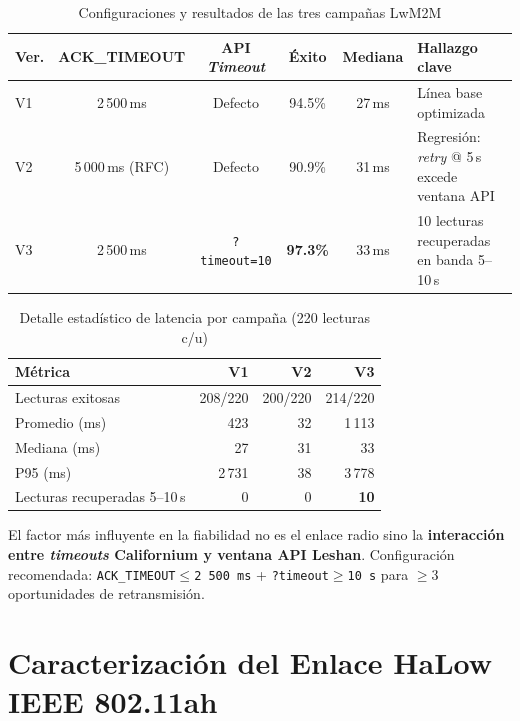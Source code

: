 \begin{table}[H]
\centering
\caption{Configuraciones y resultados de las tres campañas LwM2M}
\label{tab:versiones-v1v2v3}
\footnotesize
\begin{tabularx}{\textwidth}{l c c c c X}
\toprule
\textbf{Ver.} & \textbf{ACK\_TIMEOUT} & \textbf{API \emph{Timeout}} & \textbf{Éxito} & \textbf{Mediana} & \textbf{Hallazgo clave} \\
\midrule
V1 & 2\,500\,ms & Defecto & 94.5\% & 27\,ms & Línea base optimizada \\
V2 & 5\,000\,ms (RFC) & Defecto & 90.9\% & 31\,ms & Regresión: \emph{retry} @ 5\,s excede ventana API \\
V3 & 2\,500\,ms & \texttt{?timeout=10} & \textbf{97.3\%} & 33\,ms & 10 lecturas recuperadas en banda 5--10\,s \\
\bottomrule
\end{tabularx}
\end{table}

\begin{table}[H]
\centering
\caption{Detalle estadístico de latencia por campaña (220 lecturas c/u)}
\label{tab:resultados-v1v2v3}
\footnotesize
\begin{tabular}{l r r r}
\toprule
\textbf{Métrica} & \textbf{V1} & \textbf{V2} & \textbf{V3} \\
\midrule
Lecturas exitosas & 208/220 & 200/220 & 214/220 \\
Promedio (ms) & 423 & 32 & 1\,113 \\
Mediana (ms) & 27 & 31 & 33 \\
P95 (ms) & 2\,731 & 38 & 3\,778 \\
Lecturas recuperadas 5--10\,s & 0 & 0 & \textbf{10} \\
\bottomrule
\end{tabular}
\end{table}

El factor más influyente en la fiabilidad no es el enlace radio sino la \textbf{interacción entre \emph{timeouts} Californium y ventana API Leshan}. Configuración recomendada: \texttt{ACK\_TIMEOUT$\leq$2\,500\,ms} + \texttt{?timeout$\geq$10\,s} para $\geq$3 oportunidades de retransmisión.


\section{Caracterización del Enlace HaLow IEEE 802.11ah}
\label{sec:resultados-halow}

